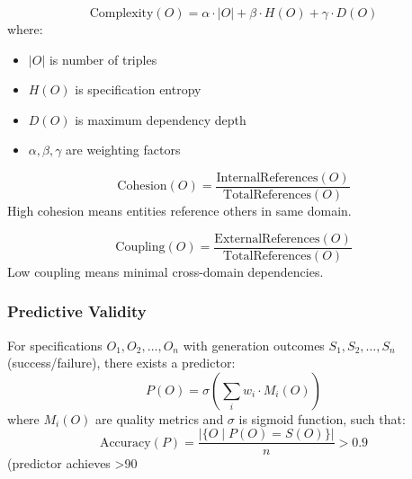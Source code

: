 \begin{definition}
    \begin{equation}
        \text{Complexity}(O) = \alpha \cdot |O| + \beta \cdot H(O) + \gamma \cdot D(O)
    \end{equation}
    where:
    \begin{itemize}
        \item $|O|$ is number of triples
        \item $H(O)$ is specification entropy
        \item $D(O)$ is maximum dependency depth
        \item $\alpha, \beta, \gamma$ are weighting factors
    \end{itemize}
\end{definition}

\begin{definition}
    \begin{equation}
        \text{Cohesion}(O) = \frac{\text{InternalReferences}(O)}{\text{TotalReferences}(O)}
    \end{equation}
    High cohesion means entities reference others in same domain.
\end{definition}

\begin{definition}
    \begin{equation}
        \text{Coupling}(O) = \frac{\text{ExternalReferences}(O)}{\text{TotalReferences}(O)}
    \end{equation}
    Low coupling means minimal cross-domain dependencies.
\end{definition}

\subsubsection{Predictive Validity}

\begin{theorem}
    For specifications $O_1, O_2, \ldots, O_n$ with generation outcomes $S_1, S_2, \ldots, S_n$ (success/failure), there exists a predictor:
    \begin{equation}
        P(O) = \sigma\left(\sum_{i} w_i \cdot M_i(O)\right)
    \end{equation}
    where $M_i(O)$ are quality metrics and $\sigma$ is sigmoid function, such that:
    \begin{equation}
        \text{Accuracy}(P) = \frac{|\{O \mid P(O) = S(O)\}|}{n} > 0.9
    \end{equation}
    (predictor achieves >90%
\end{theorem}

